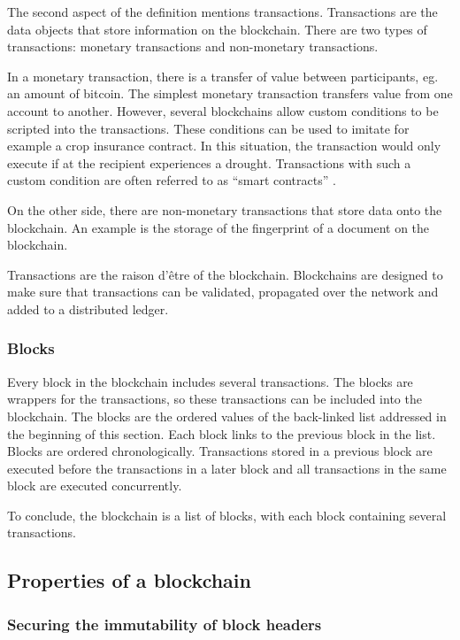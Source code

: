 The second aspect of the definition mentions transactions. Transactions are the data objects that store information on the blockchain. There are two types of transactions: monetary transactions and non-monetary transactions.

In a monetary transaction, there is a transfer of value between participants, eg. an amount of bitcoin. The simplest monetary transaction transfers value from one account to another. However, several blockchains allow custom conditions to be scripted into the transactions. These conditions can be used to imitate for example a crop insurance contract. In this situation, the transaction would only execute if at the recipient experiences a drought. Transactions with such a custom condition are often referred to as ``smart contracts'' \cite{ethereum-whitepaper}.

On the other side, there are non-monetary transactions that store data onto the blockchain. An example is the storage of the fingerprint of a document on the blockchain.

Transactions are the raison d'\^{e}tre of the blockchain. Blockchains are designed to make sure that transactions can be validated, propagated over the network and added to a distributed ledger.

\subsubsection{Blocks}

Every block in the blockchain includes several transactions. The blocks are wrappers for the transactions, so these transactions can be included into the blockchain. The blocks are the ordered values of the back-linked list addressed in the beginning of this section. Each block links to the previous block in the list. Blocks are ordered chronologically. Transactions stored in a previous block are executed before the transactions in a later block and all transactions in the same block are executed concurrently.

To conclude, the blockchain is a list of blocks, with each block containing several transactions.

\subsection{Properties of a blockchain}

\subsubsection{Securing the immutability of block headers}

